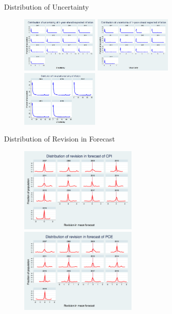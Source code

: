 \documentclass{beamer}
\begin{document}
\begin{frame}{Distribution of Uncertainty}
\begin{figure}
		\label{Unceratitny_Histogram}
	\includegraphics[width=0.33\textwidth]{figuresDraft/PRCCPIVar1_hist.png}  
\smallskip
\includegraphics[width=0.33\textwidth]{figuresDraft/PRCPCEVar1_hist.png}  
\smallskip
\includegraphics[width=0.33\textwidth]{figuresDraft/SCEvar_hist.png}  
\end{figure}
\end{frame}


\begin{frame}{Distribution of Revision in Forecast}
\begin{figure}
	\includegraphics[width=0.5\textwidth]{figuresDraft/PRCCPIMean01_rv_true_hist.png} 
\includegraphics[width=0.5\textwidth]{figuresDraft/PRCPCEMean01_rv_true_hist.png} 
\end{figure}
\end{frame}
\end{document}
